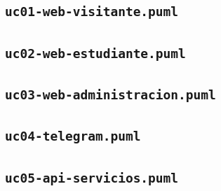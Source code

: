\documentclass[11pt,a4paper]{report}
\begin{document}
\subsection*{\texttt{uc01-web-visitante.puml}}

\subsection*{\texttt{uc02-web-estudiante.puml}}

\subsection*{\texttt{uc03-web-administracion.puml}}

\subsection*{\texttt{uc04-telegram.puml}}

\subsection*{\texttt{uc05-api-servicios.puml}}

\end{document}

